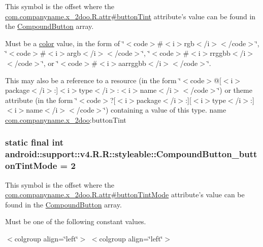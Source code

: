 This symbol is the offset where the \hyperlink{classcom_1_1companyname_1_1x__2doo_1_1_r_1_1attr_098bf3b103dda75d67334479e76ee41f}{com.companyname.x\_\-2doo.R.attr\#buttonTint} attribute's value can be found in the \hyperlink{classandroid_1_1support_1_1v4_1_1_r_1_1styleable_0f66eed6935e1b8ebc6b74c5e0089183}{CompoundButton} array.

Must be a \hyperlink{classandroid_1_1support_1_1v4_1_1_r_1_1color}{color} value, in the form of \char`\"{}$<$code$>$\#$<$i$>$rgb$<$/i$>$$<$/code$>$\char`\"{}, \char`\"{}$<$code$>$\#$<$i$>$argb$<$/i$>$$<$/code$>$\char`\"{}, \char`\"{}$<$code$>$\#$<$i$>$rrggbb$<$/i$>$$<$/code$>$\char`\"{}, or \char`\"{}$<$code$>$\#$<$i$>$aarrggbb$<$/i$>$$<$/code$>$\char`\"{}. 

This may also be a reference to a resource (in the form \char`\"{}$<$code$>$@\mbox{[}$<$i$>$package$<$/i$>$:\mbox{]}$<$i$>$type$<$/i$>$:$<$i$>$name$<$/i$>$$<$/code$>$\char`\"{}) or theme attribute (in the form \char`\"{}$<$code$>$?\mbox{[}$<$i$>$package$<$/i$>$:\mbox{]}\mbox{[}$<$i$>$type$<$/i$>$:\mbox{]}$<$i$>$name$<$/i$>$$<$/code$>$\char`\"{}) containing a value of this type.  name \hyperlink{namespacecom_1_1companyname_1_1x__2doo}{com.companyname.x\_\-2doo}:buttonTint \hypertarget{classandroid_1_1support_1_1v4_1_1_r_1_1styleable_47f68c1e5646a0561d3c3e5ba109c9f3}{
\subsubsection[{CompoundButton\_\-buttonTintMode}]{\setlength{\rightskip}{0pt plus 5cm}static final int android::support::v4.R.R::styleable::CompoundButton\_\-buttonTintMode = 2}}
\label{classandroid_1_1support_1_1v4_1_1_r_1_1styleable_47f68c1e5646a0561d3c3e5ba109c9f3}


This symbol is the offset where the \hyperlink{classcom_1_1companyname_1_1x__2doo_1_1_r_1_1attr_c0bd8a274bc2f3aecb8609e37c7e2b04}{com.companyname.x\_\-2doo.R.attr\#buttonTintMode} attribute's value can be found in the \hyperlink{classandroid_1_1support_1_1v4_1_1_r_1_1styleable_0f66eed6935e1b8ebc6b74c5e0089183}{CompoundButton} array.

Must be one of the following constant values. \begin{TabularC}{0}
\hline
\end{TabularC}
$<$colgroup align=\char`\"{}left\char`\"{}$>$ $<$colgroup align=\char`\"{}left\char`\"{}$>$ 

